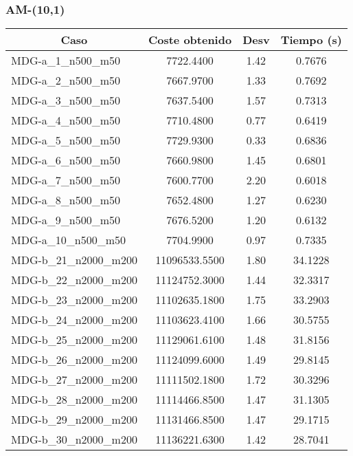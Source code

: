 \documentclass[10pt,a4paper]{article}
\begin{document}
\subsubsection{AM-(10,1)}
\begin{table}[H]
	\begin{center}
		\begin{tabular}{|l|c|c|c|} 
			\hline
			\multicolumn{1}{|c|}{\textbf{Caso}} & \textbf{Coste obtenido} & \textbf{Desv} & \textbf{Tiempo (s)} \\ \hline
			\hline
					MDG-a\_1\_n500\_m50 & 7722.4400 & 1.42 & 0.7676 \\ \hline
					MDG-a\_2\_n500\_m50 & 7667.9700 & 1.33 & 0.7692 \\ \hline
					MDG-a\_3\_n500\_m50 & 7637.5400 & 1.57 & 0.7313 \\ \hline
					MDG-a\_4\_n500\_m50 & 7710.4800 & 0.77 & 0.6419 \\ \hline
					MDG-a\_5\_n500\_m50 & 7729.9300 & 0.33 & 0.6836 \\ \hline
					MDG-a\_6\_n500\_m50 & 7660.9800 & 1.45 & 0.6801 \\ \hline
					MDG-a\_7\_n500\_m50 & 7600.7700 & 2.20 & 0.6018 \\ \hline
					MDG-a\_8\_n500\_m50 & 7652.4800 & 1.27 & 0.6230 \\ \hline
					MDG-a\_9\_n500\_m50 & 7676.5200 & 1.20 & 0.6132 \\ \hline
					MDG-a\_10\_n500\_m50 & 7704.9900 & 0.97 & 0.7335 \\ \hline
					MDG-b\_21\_n2000\_m200 & 11096533.5500 & 1.80 & 34.1228 \\ \hline
					MDG-b\_22\_n2000\_m200 & 11124752.3000 & 1.44 & 32.3317 \\ \hline
					MDG-b\_23\_n2000\_m200 & 11102635.1800 & 1.75 & 33.2903 \\ \hline
					MDG-b\_24\_n2000\_m200 & 11103623.4100 & 1.66 & 30.5755 \\ \hline
					MDG-b\_25\_n2000\_m200 & 11129061.6100 & 1.48 & 31.8156 \\ \hline
					MDG-b\_26\_n2000\_m200 & 11124099.6000 & 1.49 & 29.8145 \\ \hline
					MDG-b\_27\_n2000\_m200 & 11111502.1800 & 1.72 & 30.3296 \\ \hline
					MDG-b\_28\_n2000\_m200 & 11114466.8500 & 1.47 & 31.1305 \\ \hline
					MDG-b\_29\_n2000\_m200 & 11131466.8500 & 1.47 & 29.1715 \\ \hline
					MDG-b\_30\_n2000\_m200 & 11136221.6300 & 1.42 & 28.7041 \\ \hline

\end{tabular}
\end{center}
\end{table}
\end{document}
